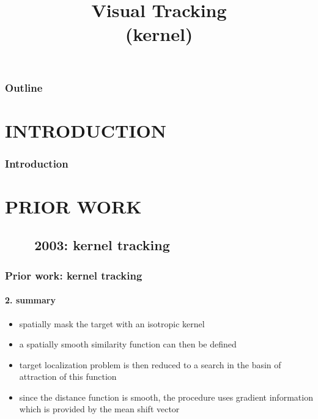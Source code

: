 
\title{Visual Tracking \\ (kernel)}
\begin{frame}[plain]\logoTechTower
	\titlepage
\end{frame}

\begin{frame}
\frametitle{Outline}
\logoCSIPCPL\logoTechTower
	\setcounter{tocdepth}{1}	
	\tableofcontents
\end{frame}

\section{INTRODUCTION}
\begin{frame}
\frametitle{Introduction}
\framesubtitle{}
\logoCSIPCPL\mypagenum
\end{frame}

\section{PRIOR WORK}
\subsection{\ \ \ \ 2003: kernel tracking}
\begin{frame}
\frametitle{Prior work: kernel tracking}
\framesubtitle{2. summary}
\mypagenum
	\begin{itemize}
		\item spatially mask the target with an isotropic kernel
		\item a spatially smooth similarity function can then be defined
		\item target localization problem is then reduced to a search in the basin of attraction of this function
		\item since the distance function is smooth, the procedure uses gradient information which is provided by the mean shift vector
	\end{itemize}
\end{frame}



\printbibliography

